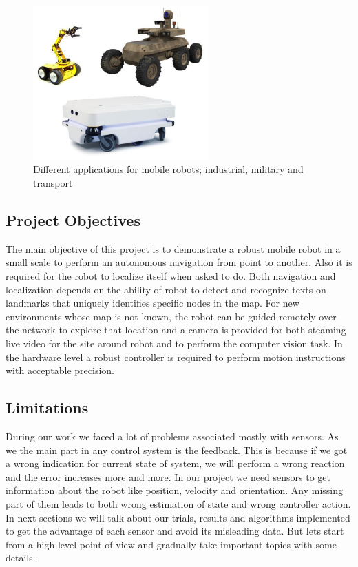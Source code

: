 \documentclass[12pt]{article}
\begin{document}
\begin{figure}[H]
 \centering
\includegraphics[width =0.6\textwidth]{Fig/mobile_robots_apps.jpg}
\caption{Different applications for mobile robots; industrial, military and transport}

\end{figure}

\subsection{Project Objectives}
The main objective of this project is to demonstrate a robust mobile robot in a small scale to perform an autonomous navigation from point to another. Also it is required for the robot to localize itself when asked to do. Both navigation and localization depends on the ability of robot to detect and recognize texts on landmarks that uniquely identifies specific nodes in the map.
For new environments whose map is not known, the robot can be guided remotely over the network to explore that location and a camera is provided for both steaming live video for the site around robot and to perform the computer vision task.
In the hardware level a robust controller is required to perform motion instructions with acceptable precision.

\newpage

\subsection{Limitations}
During our work we faced a lot of problems associated mostly with sensors. As we the main part in any control system is the feedback. This is because if we got a wrong indication for current state of system, we will perform a wrong reaction and the error increases more and more. In our project we need sensors to get information about the robot like position, velocity and orientation. Any missing part of them leads to both wrong estimation of state and wrong controller action.
In next sections we will talk about our trials, results and algorithms implemented to get the advantage of each sensor and avoid its misleading data.
\noindent But lets start from a high-level point of view and gradually take important topics with some details.
\end{document}
